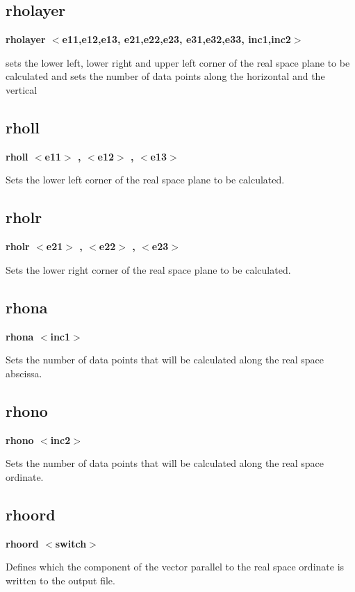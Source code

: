 \subsection*{rholayer}
{\bf rholayer $ <$e11,e12,e13, e21,e22,e23, e31,e32,e33, inc1,inc2$> $ \par }
\par
\vspace{3pt}
sets the lower left, lower right and upper left corner of the 
real space plane to be calculated and sets the number of data 
points along the horizontal and the vertical 
\subsection*{rholl}
{\bf rholl $ <$e11$> $ , $ <$e12$> $ , $ <$e13$> $ \par }
\par
\vspace{3pt}
Sets the lower left corner of the real space plane to be calculated. 
\subsection*{rholr}
{\bf rholr $ <$e21$> $ , $ <$e22$> $ , $ <$e23$> $ \par }
\par
\vspace{3pt}
Sets the lower right corner of the real space plane to be calculated. 
\subsection*{rhona}
{\bf rhona $ <$inc1$> $ \par }
\par
\vspace{3pt}
Sets the number of data points that will be calculated along the 
real space abscissa. 
\subsection*{rhono}
{\bf rhono $ <$inc2$> $ \par }
\par
\vspace{3pt}
Sets the number of data points that will be calculated along the 
real space ordinate. 
\subsection*{rhoord}
{\bf rhoord $ <$switch$> $ \par }
\par
\vspace{3pt}
Defines which the component of the vector parallel to the 
real space ordinate is written to the output file. 
